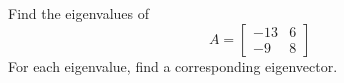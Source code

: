 \documentclass[minion]{homework}
\begin{document}
\begin{aproblems}
Find the eigenvalues of
\[
A= \begin{bmatrix} -13 & 6 \\ -9 & 8 \end{bmatrix}
\]
For each eigenvalue, find a corresponding eigenvector.
\end{aproblems}
\end{document}
